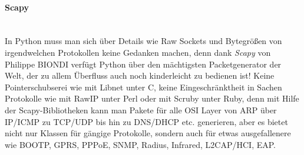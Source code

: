 \documentclass[paper=a4,fontsize=11pt]{scrartcl}%
\numberwithin{equation}{section}
\begin{document}
\paragraph{Scapy}~\\
In Python muss man sich über Details wie Raw Sockets und Bytegrößen von irgendwelchen Protokollen keine Gedanken machen, denn dank \emph{Scapy} von Philippe BIONDI verfügt Python über den mächtigsten Packetgenerator der Welt, der zu allem Überfluss auch noch kinderleicht zu bedienen ist! Keine Pointerschubserei wie mit Libnet unter C, keine Eingeschränktheit in Sachen Protokolle wie mit RawIP unter Perl oder mit Scruby unter Ruby, denn mit Hilfe der Scapy-Bibliotheken kann man Pakete für alle OSI Layer von ARP über IP/ICMP zu TCP/UDP bis hin zu DNS/DHCP etc. generieren, aber es bietet nicht nur Klassen für gängige Protokolle, sondern auch für etwas ausgefallenere wie BOOTP, GPRS, PPPoE, SNMP, Radius, Infrared, L2CAP/HCI, EAP.
\end{document}
